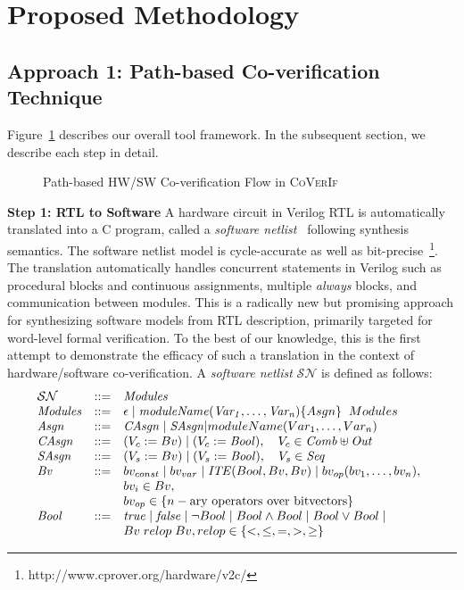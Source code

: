 \documentclass[sigconf]{acmart}
\newcommand{\tool}[1]{\textsc{#1}\xspace}
\newcommand{\verifox}{\tool{CoVerIf}}
\begin{document}
\section{Proposed Methodology}
%
\subsection{Approach 1: Path-based Co-verification Technique}
%
Figure~\ref{proposed-flow} describes our overall tool framework. In the
subsequent section, we describe each step in detail.\\ 
%
\begin{figure}[t]
{}
\caption{\small Path-based HW/SW Co-verification Flow in \verifox
\label{proposed-flow}}
\end{figure}
%
\textbf{Step 1: RTL to Software}
A hardware circuit in Verilog RTL is automatically 
translated into a C program, called a 
\textit{software netlist}~\cite{mtk2016,mskm2016,mkm2015} following synthesis 
semantics. The software netlist model is cycle-accurate as well as 
bit-precise~\footnote{http://www.cprover.org/hardware/v2c/}. The 
translation automatically handles concurrent statements 
in Verilog such as procedural blocks and continuous assignments, multiple {\em always}
blocks, and communication between modules.  This is a radically new 
but promising approach for synthesizing software 
models from RTL description, primarily targeted for word-level formal verification.  
To the best of our knowledge, this is the first attempt to demonstrate the 
efficacy of such a translation in the context of hardware/software co-verification. 
% 
A \textit{software netlist} $\mathcal{SN}$ is defined as follows:
%
\[ 
\begin{array}[t]{@{}lll}
\mathcal{SN} & {:}{:}{=} & \mathit{Modules} \\
\mathit{Modules} & {:}{:}{=} & \epsilon \mid \mathit{moduleName(Var_1,\dots,Var_n)} \{ Asgn \} \;\; Modules \\
\mathit{Asgn} &  {:}{:}{=} & \mathit{CAsgn} \mid \mathit{SAsgn} | moduleName(Var_1,\dots,Var_n)\\
\mathit{CAsgn} & {:}{:}{=} & (V_c := Bv) \mid (V_c := \mathit{Bool}), \quad V_c \in \mathit{Comb} \uplus \mathit{Out} \\
\mathit{SAsgn} & {:}{:}{=} & (V_s := Bv) \mid (V_s := \mathit{Bool}), \quad V_s \in \mathit{Seq} \\
\mathit{Bv} &  {:}{:}{=} & bv_{const} \mid bv_{var} \mid
	\mathit{ITE}(Bool, Bv, Bv) \mid
bv_{op}(bv_1, \ldots, bv_n), \\
& & bv_i \in Bv, \\ 
& & bv_{op} \in \{n-\text{ary operators over bitvectors} \} \\
\mathit{Bool} & {:}{:}{=} & \mathit{true} \mid \mathit{false} \mid \neg{Bool} \mid Bool \land Bool \mid 
Bool \lor Bool \mid \\ 
& & Bv\; relop\; Bv, relop \in \{<,\leq,=,>,\geq\} \\
\end{array}
\]
\end{document}

